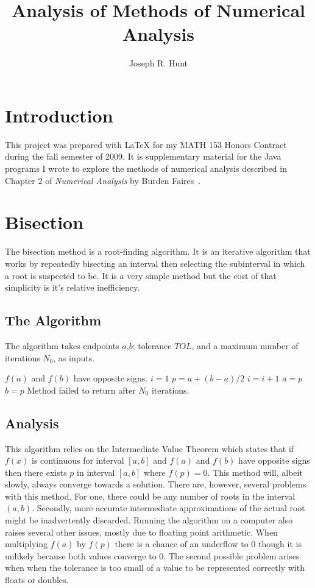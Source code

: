 \documentclass[12pt,oneside]{amsart}
\title{Analysis of Methods of Numerical Analysis}
\author{Joseph R. Hunt}
\begin{document}
 
\maketitle

\section{Introduction} This project was prepared with \LaTeX{} for my MATH 153 Honors Contract during the fall semester of 2009. It is supplementary material for the Java programs I wrote to explore the methods of numerical analysis described in Chapter 2 of \emph{Numerical Analysis} by Burden Faires~\cite{bF93}.

\section{Bisection}

The bisection method is a root-finding algorithm. It is an iterative algorithm that works by repeatedly bisecting an interval then selecting the subinterval in which a root is suspected to be. It is a very simple method but the cost of that simplicity is it's relative inefficiency.

\subsection{The Algorithm}

The algorithm takes endpoints $a$,$b$; tolerance $TOL$, and a maximum number of iterations $N_0$, as inputs. 
\begin{algorithmic}
	\REQUIRE $f(a)$ and $f(b)$ have opposite signs. \STATE $i=1$  \STATE $p = a + (b-a)/2$   \ENDIF \STATE $i = i + 1$  \STATE $a = p$ \ELSE \STATE $b = p$ \ENDWHILE \PRINT Method failed to return after $N_0$ iterations. 
\end{algorithmic}
\subsection{Analysis}

This algorithm relies on the Intermediate Value Theorem which states that if $f(x)$ is continuous for interval $[a,b]$ and $f(a)$ and $f(b)$ have opposite signs then there exists $p$ in interval $[a,b]$ where $f(p) = 0$. This method will, albeit slowly, always converge towards a solution. There are, however, several problems with this method. For one, there could be any number of roots in the interval $(a,b)$. Secondly, more accurate intermediate approximations of the actual root might be inadvertently discarded. Running the algorithm on a computer also raises several other issues, mostly due to floating point arithmetic. When multiplying $f(a)$ by $f(p)$ there is a chance of an underflow to 0 though it is unlikely because both values converge to 0. The second possible problem arises when when the tolerance is too small of a value to be represented correctly with floats or doubles.
\end{document}
